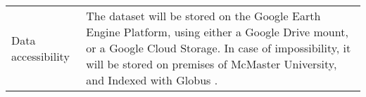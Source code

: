 \documentclass[times,final]{elsarticle}
\begin{document}
{\begin{longtable}{|p{33mm}|p{94mm}|}
\hline                         
\hypertarget{target1}
{Data accessibility}   & The dataset will be stored on the Google Earth Engine 
                        Platform\cite{5}, using either a Google Drive mount, or a Google Cloud Storage.
                        \newline \newline
                        In case of impossibility, it will be stored on premises of McMaster University, and Indexed with Globus \cite{6}.\\








\end{longtable}}
\end{document}
